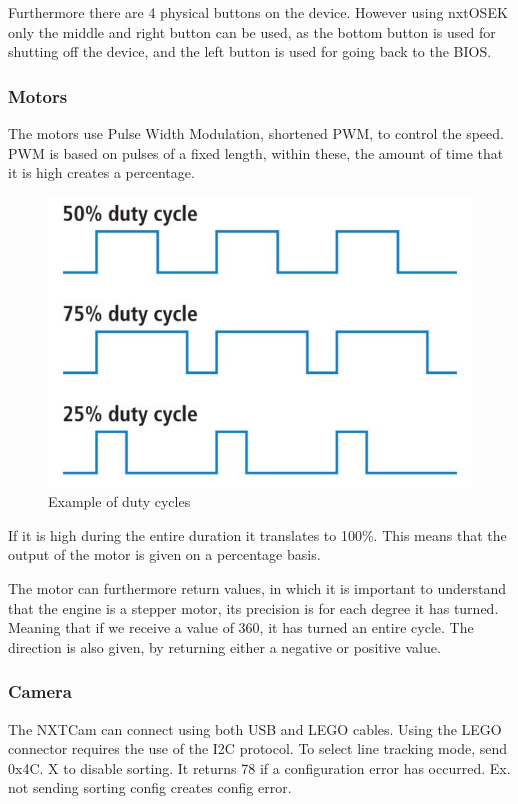 Furthermore there are 4 physical buttons on the device. However using nxtOSEK only the middle and right button can be used, as the bottom button is used for shutting off the device, and the left button is used for going back to the BIOS.

\subsubsection*{Motors}
The motors use Pulse Width Modulation, shortened PWM, to control the speed. PWM is based on pulses of a fixed length, within these, the amount of time that it is high creates a percentage.

\begin{figure}[H]
    \label{software_duty_cycles}
    \centering
    \includegraphics[scale=0.8]{Images/Software/NXT/duty_cycle.jpg}
    \caption{Example of duty cycles}
\end{figure}

If it is high during the entire duration it translates to 100\%. This means that the output of the motor is given on a percentage basis.

The motor can furthermore return values, in which it is important to understand that the engine is a stepper motor, its precision is for each degree it has turned. Meaning that if we receive a value of 360, it has turned an entire cycle. The direction is also given, by returning either a negative or positive value.

\subsubsection*{Camera}
The NXTCam can connect using both USB and LEGO cables. Using the LEGO connector requires the use of the I2C protocol.
To select line tracking mode, send 0x4C. X to disable sorting. It returns 78 if a configuration error has occurred. Ex. not sending sorting config creates config error.

